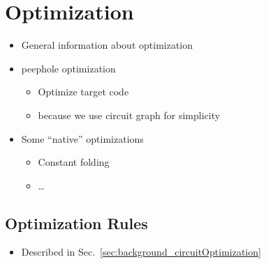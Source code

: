 \section{Optimization}
\begin{itemize}
    \item General information about optimization
    \item peephole optimization
    \begin{itemize}
        \item Optimize target code
        \item because we use circuit graph for simplicity
    \end{itemize}
    \item Some ``native'' optimizations
    \begin{itemize}
        \item Constant folding
        \item \dots
    \end{itemize}
\end{itemize}

\subsection{Optimization Rules}
\begin{itemize}
    \item Described in Sec.~\ref{sec:background_circuitOptimization}
\end{itemize}

